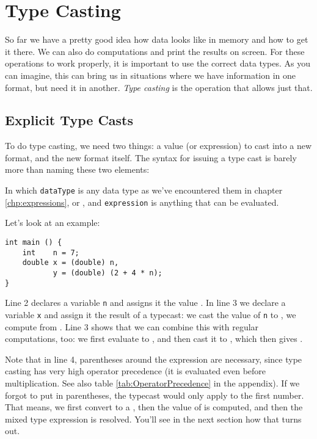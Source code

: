 {\section{Type Casting}
So far we have a pretty good idea how data looks like in memory and how to get it there. We can also do computations and print the results on screen. For these operations to work properly, it is important to use the correct data types. As you can imagine, this can bring us in situations where we have information in one format, but need it in another. \emph{Type casting} is the operation that allows just that.

\subsection{Explicit Type Casts}
To do type casting, we need two things: a value (or expression) to cast into a new format, and the new format itself. The syntax for issuing a type cast is barely more than naming these two elements:
\begin{codebox}
\end{codebox}
In which \texttt{dataType} is any data type as we've encountered them in chapter \ref{chp:expressions}, \eg {} or , and \texttt{expression} is anything that can be evaluated.

Let's look at an example:
\begin{codebox}
\begin{verbatim}
int main () {
    int    n = 7;
    double x = (double) n,
           y = (double) (2 + 4 * n);
}
\end{verbatim}
\end{codebox}
Line 2 declares a  variable \texttt{n} and assigns it the value . In line 3 we declare a  variable \texttt{x} and assign it the result of a typecast: we cast the value of \texttt{n} to , \ie we compute  from . Line 3 shows that we can combine this with regular computations, too: we first evaluate  to , and then cast it to , which then gives .

Note that in line 4, parentheses around the expression are necessary, since type casting has very high operator precedence (\ie it is evaluated even before multiplication. See also table \ref{tab:OperatorPrecedence} in the appendix). If we forgot to put  in parentheses, the typecast would only apply to the first number. That means, we first convert  to a , then the  value of  is computed, and then the mixed type expression  is resolved. You'll see in the next section how that turns out.

}
